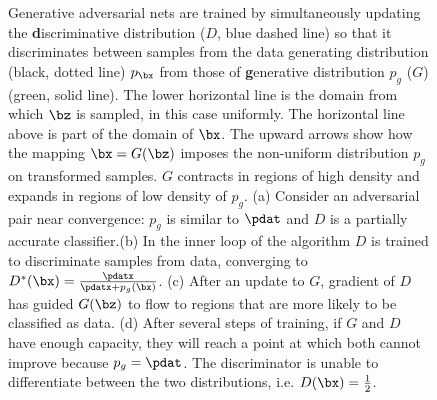 
\newcommand{\gaussfunc}[2]{
	1/(sqrt(2*pi*(#1)^2))*exp(-(x-#2)^2/(2*#1^2))
}
\newcommand{\blackdottedgauss}{
	\addplot[
		domain=-5:5,
		samples=30,
		color=black,
		mark=*,
		only marks,
	]{
		\gaussfunc{1}{0}
	};
}

\newcommand{\greencont}[2]{
	\addplot[
		domain=-5:5,
		samples=60,
		color=green!60!black,
	]{
		\gaussfunc{#1}{#2}
	};
}
\begin{figure}[htb]
	\resizebox{0.2\textwidth}{!}{\subfigure[]{}}\hfill
	\resizebox{0.2\textwidth}{!}{\subfigure[]{}}\hfill
	\resizebox{0.2\textwidth}{!}{\subfigure[]{}}\hfill
	\resizebox{0.2\textwidth}{!}{\subfigure[]{}}\hfill

	\caption{Generative adversarial nets are trained by simultaneously updating the \textbf{d}iscriminative distribution ($D$, blue dashed line) so that it discriminates between samples from the data generating distribution (black, dotted line) $p_{\bx}$ from those of \textbf{g}enerative distribution $p_g$ ($G$) (green, solid line). The lower horizontal line is the domain from which $\bz$ is sampled, in this case uniformly. The horizontal line above is part of the domain of $\bx$. The upward arrows show how the mapping $\bx = G(\bz)$ imposes the non-uniform distribution $p_g$ on transformed samples. $G$ contracts in regions of high density and expands in regions of low density of $p_g$. (a) Consider an adversarial pair near convergence: $p_g$ is similar to $\pdat$ and $D$ is a partially accurate classifier.(b) In the inner loop of the algorithm $D$ is trained to discriminate samples from data, converging to $D^{\ast}(\bx) = \frac{\pdatx}{\pdatx+p_g(\bx)}$. (c) After an update to $G$, gradient of $D$ has guided $G(\bz)$ to flow to regions that are more likely to be classified as data. (d) After several steps of training, if $G$ and $D$ have enough capacity, they will reach a point at which both cannot improve because $p_g = \pdat$. The discriminator is unable to differentiate between the two distributions, i.e. $D(\bx)=\frac{1}{2}$.}
	\label{fig: figure 1}
\end{figure}